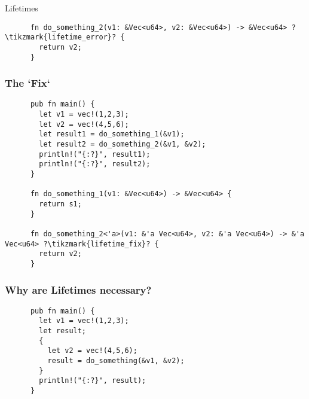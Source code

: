 \begin{section}{Lifetimes}
\begin{frame}[fragile]
\begin{verbatim}
      fn do_something_2(v1: &Vec<u64>, v2: &Vec<u64>) -> &Vec<u64> ?\tikzmark{lifetime_error}? {
        return v2;
      }
    \end{verbatim}
  \end{frame}

  \begin{frame}[fragile]
    \frametitle{The `Fix`}
    \begin{verbatim}
      pub fn main() {
        let v1 = vec!(1,2,3);
        let v2 = vec!(4,5,6);
        let result1 = do_something_1(&v1);
        let result2 = do_something_2(&v1, &v2);
        println!("{:?}", result1);
        println!("{:?}", result2);
      }

      fn do_something_1(v1: &Vec<u64>) -> &Vec<u64> {
        return s1;
      }

      fn do_something_2<'a>(v1: &'a Vec<u64>, v2: &'a Vec<u64>) -> &'a Vec<u64> ?\tikzmark{lifetime_fix}? {
        return v2;
      }
    \end{verbatim}
  \end{frame}

    \begin{frame}[fragile]
    \frametitle{Why are Lifetimes necessary? \cite{RustLangCh10}}
    \begin{verbatim}
      pub fn main() {
        let v1 = vec!(1,2,3);
        let result;
        {
          let v2 = vec!(4,5,6);
          result = do_something(&v1, &v2);
        }
        println!("{:?}", result);
      }


\end{verbatim}
\end{frame}
\end{section}
